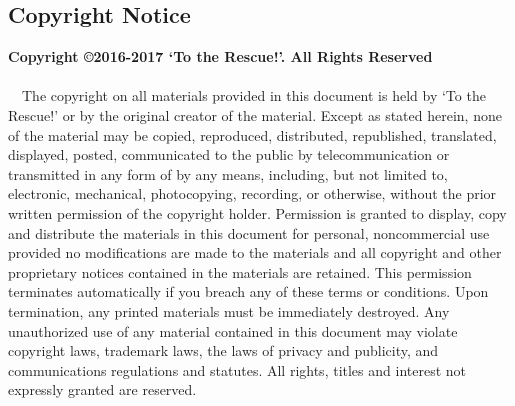\documentclass[12pt]{report}
\begin{document}
	\vfill
	 
	\subsection*{Copyright Notice}
	\label{subsec:CopyrightNotice}
		{\bfseries Copyright ©2016-2017 ‘To the Rescue!’. All Rights Reserved}
		\paragraph{}\ \ The copyright on all materials provided in this document is held by ‘To the Rescue!’ or by the original creator of the material. Except as stated herein, none of the material may be copied, reproduced, distributed, republished, translated, displayed, posted, communicated to the public by telecommunication or transmitted in any form of by any means, including, but not limited to, electronic, mechanical, photocopying, recording, or otherwise, without the prior written permission of the copyright holder. Permission is granted to display, copy and distribute the materials in this document for personal, noncommercial use provided no modifications are made to the materials and all copyright and other proprietary notices contained in the materials are retained. This permission terminates automatically if you breach any of these terms or conditions. Upon termination, any printed materials must be immediately destroyed. Any unauthorized use of any material contained in this document may violate copyright laws, trademark laws, the laws of privacy and publicity, and communications regulations and statutes. All rights, titles and interest not expressly granted are reserved.    
	\pagebreak
\end{document}
